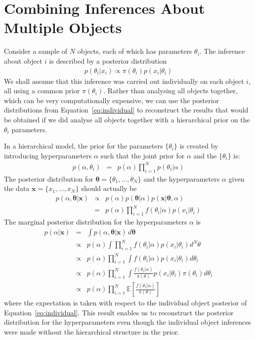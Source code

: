 \documentclass[useAMS,usenatbib]{mn2e}
\renewcommand{\btheta}{\boldsymbol{\theta}}
\newcommand{\bx}{\boldsymbol{x}}
\begin{document}
\section{Combining Inferences About Multiple Objects}
Consider a sample of $N$ objects, each of which has parameters $\theta_i$.
The inference about object $i$ is described by a posterior distribution
\begin{eqnarray}
p(\theta_i | x_i) \propto \pi(\theta_i)p(x_i | \theta_i)\label{eq:individual}
\end{eqnarray}
We shall assume that this inference was carried out individually
on each object $i$, all using a common prior $\pi(\theta_i)$. Rather than
analysing all objects together, which can be very computationally expensive,
we can use the posterior distributions from Equation~\ref{eq:individual}
to reconstruct the results that would be obtained if we did analyse all
objects together with a hierarchical prior on the $\theta_i$ parameters.

In a hierarchical model, the prior for the parameters $\{\theta_i\}$ is created
by introducing hyperparameters $\alpha$ such that the joint prior for $\alpha$
and the $\{\theta_i\}$ is:
\begin{eqnarray}
p(\alpha, \theta_i) &=& p(\alpha)\prod_{i=1}^N p(\theta_i | \alpha)
\end{eqnarray}
The posterior distribution for
$\btheta = \{\theta_1, ..., \theta_N\}$ and the hyperparameters $\alpha$
given the data 
$\bx = \{x_1, ..., x_N\}$
should actually be
\begin{eqnarray}
p(\alpha, \btheta | \bx) &\propto&
p(\alpha)p(\btheta|\alpha)p(\bx | \btheta, \alpha)\\
&=& p(\alpha)\prod_{i=1}^N f(\theta_i|\alpha)p(x_i | \theta_i)
\end{eqnarray}
The marginal posterior distribution for the hyperparameters $\alpha$ is
\begin{eqnarray}
p(\alpha | \bx) &=&
\int p(\alpha, \btheta|\bx) \, d\btheta\\
&\propto& p(\alpha)\int \prod_{i=1}^N f(\theta_i|\alpha)p(x_i | \theta_i) d^N\theta\\
&\propto& p(\alpha) \prod_{i=1}^N \int f(\theta_i|\alpha)p(x_i | \theta_i) d\theta_i\\
&\propto& p(\alpha) \prod_{i=1}^N \int \frac{f(\theta_i|\alpha)}{\pi(\theta)}p(x_i | \theta_i) \pi(\theta_i)d\theta_i\\
&\propto& p(\alpha) \prod_{i=1}^N \mathds{E}\left[\frac{f(\theta_i|\alpha)}{\pi(\theta)}\right]
\end{eqnarray}
where the expectation is taken with respect to the individual object posterior
of Equation~\ref{eq:individual}. This result enables us to reconstruct the
posterior distribution for the hyperparameters even though the individual object
inferences were made without the hierarchical structure in the prior.
\end{document}
